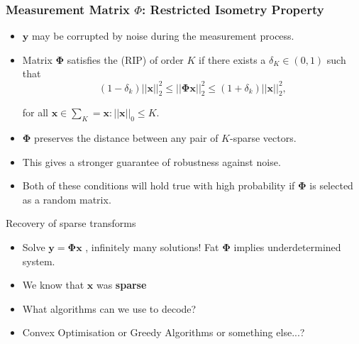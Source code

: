 \documentclass{beamer}
\begin{document}
\begin{frame}
  \frametitle{Measurement Matrix $\Phi$: Restricted Isometry Property}

  \begin{itemize}
  \item $\boldsymbol{y}$ may be corrupted by noise during the measurement process.

  \item Matrix $\boldsymbol{\Phi}$ satisfies the (RIP) of order $K$ if there exists a $\delta_K  \in (0,1)$ such that 
\begin{equation*}
  \label{eq:40}
  (1 - \delta_k)||\boldsymbol{x}||^2_2 \leq||\boldsymbol{\Phi} \boldsymbol{x}||^2_2 \leq (1 + \delta_k)||\boldsymbol{x}||^2_2,
\end{equation*}

for all $\boldsymbol{x} \in \sum_K = {\boldsymbol{x}:||\boldsymbol{x}||_0 \leq K} $. 


 \item  $\boldsymbol{\Phi}$ preserves the distance between any pair of $K$-sparse vectors.
\item This  gives a stronger guarantee of robustness against noise. 

\item Both of these conditions will hold true with high probability if $\boldsymbol{\Phi}$ is selected as a random matrix.
  \end{itemize}

\end{frame}

      \begin{frame}{Recovery of sparse transforms}
\label{recovery}
        \begin{itemize}
\item Solve $\boldsymbol{y} = \boldsymbol{\Phi x}$ , infinitely many solutions! Fat $\boldsymbol{\Phi}$ implies underdetermined system. 
\item We know that $\boldsymbol{x}$ was \textbf{sparse} 
\item What algorithms can we use to decode? 
\item Convex Optimisation or Greedy Algorithms or something else...?
        \end{itemize}

\hyperlink{l1}{}
\hyperlink{omp}{}
\end{frame}
\end{document}
